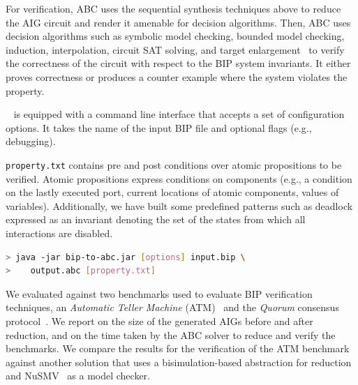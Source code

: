 

For verification, 
ABC uses the sequential synthesis techniques above to reduce the 
AIG circuit and render it amenable for decision algorithms. 
Then, ABC uses decision algorithms such as 
symbolic model checking, bounded model checking, induction, 
interpolation, circuit SAT solving, 
and target enlargement~\cite{MoGS00,MoMZ01,HoSH00,BaKuAb02,Hari05expert}
to verify the correctness of the circuit with respect to the BIP system invariants. 
It either proves correctness or produces a counter example where the system violates the property. 




\biptool~ is equipped with a command line interface that accepts a set 
of configuration options. 
It takes the name of the input BIP file and optional flags (e.g., debugging).
 
\texttt{property.txt} contains pre and post conditions over atomic propositions to be verified. Atomic propositions express conditions on components (e.g., a condition on the lastly executed port, current locations of atomic components, values of variables). Additionally, we have built some predefined patterns such as deadlock expressed as an invariant denoting the set of the states from which all interactions are disabled.

\begin{lstlisting}[language=Bash]
> java -jar bip-to-abc.jar [options] input.bip \
>    output.abc [property.txt]
\end{lstlisting}

We evaluated \biptool{} against two benchmarks used to evaluate BIP verification techniques, 
an {\em Automatic Teller Machine} (ATM)~\cite{atm} and the {\em Quorum} consensus
protocol~\cite{guerraoui2012speculative}. We report on the size of the generated
AIGs before and after reduction, and on the time taken by the ABC solver to 
reduce and verify the benchmarks. We compare the results for the 
verification of the ATM benchmark against another solution that uses a bisimulation-based abstraction for reduction \cite{facs14} and NuSMV~\cite{nusmv} as a model checker. 
%
